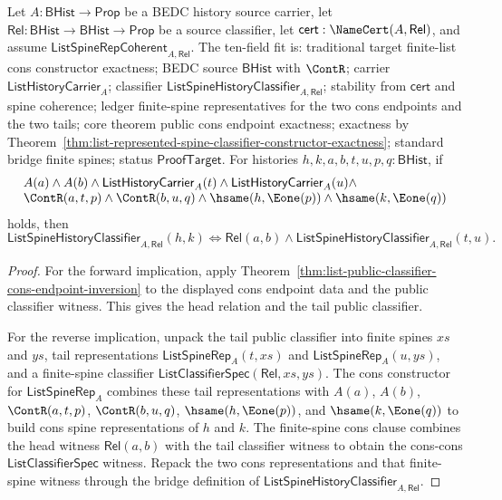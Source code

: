 \begin{theorem}
\label{thm:list-public-classifier-cons-endpoint-exactness}
Let $A:\mathsf{BHist}\to\mathsf{Prop}$ be a BEDC history source carrier, let
$\mathsf{Rel}:\mathsf{BHist}\to\mathsf{BHist}\to\mathsf{Prop}$ be a source
classifier, let $\mathsf{cert}:\NameCert(A,\mathsf{Rel})$, and assume
$\mathsf{ListSpineRepCoherent}_{A,\mathsf{Rel}}$. The ten-field fit is:
traditional target finite-list cons constructor exactness; BEDC source
$\mathsf{BHist}$ with $\ContR$; carrier $\mathsf{ListHistoryCarrier}_A$;
classifier $\mathsf{ListSpineHistoryClassifier}_{A,\mathsf{Rel}}$; stability
from $\mathsf{cert}$ and spine coherence; ledger finite-spine representatives
for the two cons endpoints and the two tails; core theorem public cons endpoint
exactness; exactness by
Theorem~\ref{thm:list-represented-spine-classifier-constructor-exactness};
standard bridge finite spines; status $\mathsf{ProofTarget}$. For histories
$h,k,a,b,t,u,p,q:\mathsf{BHist}$, if
$$
\begin{array}{l}
A(a)\land A(b)\land
\mathsf{ListHistoryCarrier}_A(t)\land
\mathsf{ListHistoryCarrier}_A(u)\land\\
\ContR(a,t,p)\land \ContR(b,u,q)\land
\hsame(h,\Eone(p))\land \hsame(k,\Eone(q))
\end{array}
$$
holds, then
$$
\mathsf{ListSpineHistoryClassifier}_{A,\mathsf{Rel}}(h,k)
\Longleftrightarrow
\mathsf{Rel}(a,b)\land
\mathsf{ListSpineHistoryClassifier}_{A,\mathsf{Rel}}(t,u).
$$
\end{theorem}
\begin{proof}
For the forward implication, apply
Theorem~\ref{thm:list-public-classifier-cons-endpoint-inversion} to the displayed
cons endpoint data and the public classifier witness. This gives the head
relation and the tail public classifier.

For the reverse implication, unpack the tail public classifier into finite
spines $xs$ and $ys$, tail representations $\mathsf{ListSpineRep}_A(t,xs)$ and
$\mathsf{ListSpineRep}_A(u,ys)$, and a finite-spine classifier
$\mathsf{ListClassifierSpec}(\mathsf{Rel},xs,ys)$. The cons constructor for
$\mathsf{ListSpineRep}_A$ combines these tail representations with $A(a)$,
$A(b)$, $\ContR(a,t,p)$, $\ContR(b,u,q)$, $\hsame(h,\Eone(p))$, and
$\hsame(k,\Eone(q))$ to build cons spine representations of $h$ and $k$. The
finite-spine cons clause combines the head witness $\mathsf{Rel}(a,b)$ with the
tail classifier witness to obtain the cons-cons
$\mathsf{ListClassifierSpec}$ witness. Repack the two cons representations and
that finite-spine witness through the bridge definition of
$\mathsf{ListSpineHistoryClassifier}_{A,\mathsf{Rel}}$.
\end{proof}

